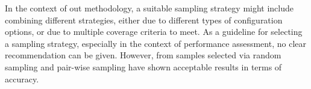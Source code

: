 In
the context of out methodology, a suitable sampling strategy might include
combining different strategies, either due to different types of configuration
options, or due to multiple coverage criteria to meet. As a guideline for
selecting a sampling strategy, especially in the context of performance
assessment, no clear recommendation can be given. However, from samples
selected via random sampling \citep{sarkar_cost-efficient_2015} and pair-wise
sampling \citep{siegmund_performance-influence_2015} have shown acceptable results in terms
of accuracy.
